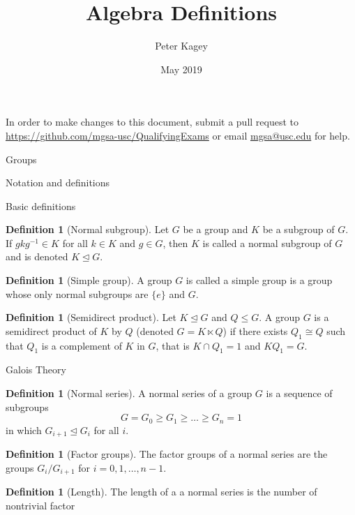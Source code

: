 \documentclass{article}
\title{Algebra Definitions}
\author{Peter Kagey}
\date{May 2019}
\theoremstyle{definition}
\numberwithin{theorem}{subsection} %
\theoremstyle{remark}
\theoremstyle{definition}
\newtheorem{definition}[paragraph]{Definition}
\newcommand{\set}[1]{\{#1\}}
\begin{document}
\maketitle

In order to make changes to this document, submit a pull request to
\linebreak
\url{https://github.com/mgsa-usc/QualifyingExams}
or email \href{mailto:mgsa@usc.edu}{mgsa@usc.edu} for help.

\begin{section}{Groups}
  \begin{subsection}{Notation and definitions}
    \begin{subsubsection}{Basic definitions}
      \begin{definition}[Normal subgroup]
        Let $G$ be a group and $K$ be a subgroup of $G$. If $gkg^{-1} \in K$
        for all $k \in K$ and $g \in G$, then $K$ is called a normal subgroup of
        $G$ and is denoted $K \trianglelefteq G$.
      \end{definition}
      \begin{definition}[Simple group]
        A group $G$ is called a simple group is a group whose only normal
        subgroups are $\set e$ and $G$.
      \end{definition}
      \begin{definition}[Semidirect product]
        Let $K \trianglelefteq G$ and $Q \leq G$. A group $G$ is a semidirect
        product of $K$ by $Q$ (denoted $G = K \ltimes Q$) if there exists
        $Q_1 \cong Q$ such that $Q_1$ is a
        complement of $K$ in $G$, that is $K \cap Q_1 = 1$ and $KQ_1 = G$.
      \end{definition}
    \end{subsubsection}
    \begin{subsubsection}{Galois Theory}
      \begin{definition}[Normal series]
        A normal series of a group $G$ is a sequence of subgroups \[
          G = G_0 \geq G_1 \geq \hdots \geq G_n = 1
        \] in which $G_{i+1} \trianglelefteq G_i$ for all $i$.
      \end{definition}
      \begin{definition}[Factor groups]
        The factor groups of a normal series are the groups $G_i/G_{i+1}$ for
        $i = 0, 1, \hdots, n-1$.
      \end{definition}
      \begin{definition}[Length]
        The length of a a normal series is the number of nontrivial factor

\end{definition}
\end{subsubsection}
\end{subsection}
\end{section}
\end{document}
